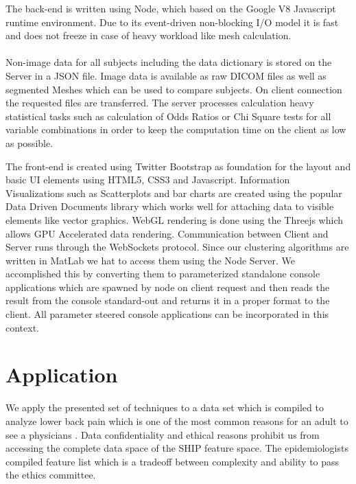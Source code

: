 \documentclass[journal]{style/vgtc} 			          %
\begin{document}
The back-end is written using Node, which based on the Google V8 Javascript runtime environment.
%
Due to its event-driven non-blocking I/O model it is fast and does not freeze in case of heavy workload like mesh calculation.
\\\\
Non-image data for all subjects including the data dictionary is stored on the Server in a JSON file.
%
Image data is available as raw DICOM files as well as segmented Meshes which can be used to compare subjects.
%
On client connection the requested files are transferred.
%
The server processes calculation heavy statistical tasks such as calculation of Odds Ratios or Chi Square tests for all variable combinations in order to keep the computation time on the client as low as possible.
%

The front-end is created using Twitter Bootstrap as foundation for the layout and basic UI elements using HTML5, CSS3 and Javascript.
%
Information Visualizations such as Scatterplots and bar charts are created using the popular Data Driven Documents library which works well for attaching data to visible elements like vector graphics.
%
WebGL rendering is done using the Threejs which allows GPU Accelerated data rendering.
%
Communication between Client and Server runs through the WebSockets protocol.
%
Since our clustering algorithms are written in MatLab we hat to access them using the Node Server.
%
We accomplished this by converting them to parameterized standalone console applications which are spawned by node on client request and then reads the result from the console standard-out and returns it in a proper format to the client.
%
All parameter steered console applications can be incorporated in this context.

\section{Application}
We apply the presented set of techniques to a data set which is compiled to analyze lower back pain which is one of the most common reasons for an adult to see a physicians \cite{Backpain}.
%
Data confidentiality and ethical reasons prohibit us from accessing the complete data space of the SHIP feature space.
%
The epidemiologists compiled feature list which is a tradeoff between complexity and ability to pass the ethics committee.
%
%
\end{document}
